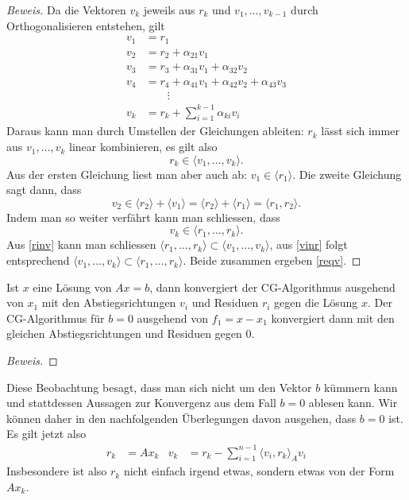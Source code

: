 \documentclass[a4paper,11pt]{article}
\begin{document}
\begin{proof}[Beweis]
Da die Vektoren $v_k$ jeweils aus $r_k$ und $v_1,\dots,v_{k-1}$
durch Orthogonalisieren entstehen, gilt
\begin{align*}
v_1 &= r_1
\\
v_2 &= r_2 + \alpha_{21}v_1
\\
v_3 &= r_3 + \alpha_{31}v_1 + \alpha_{32}v_2
\\
v_4 &= r_4 + \alpha_{41}v_1 + \alpha_{42}v_2 + \alpha_{43}v_3
\\
&\qquad\vdots
\\
v_k &= r_k + \sum_{i=1}^{k-1} \alpha_{ki} v_i
\end{align*}
Daraus kann man durch Umstellen der Gleichungen ableiten: $r_k$ lässt
sich immer aus $v_1,\dots,v_k$ linear kombinieren, es gilt also
\begin{equation}
r_k
\in
\langle v_1,\dots,v_k \rangle.
\label{rinv}
\end{equation}
Aus der ersten Gleichung liest man aber auch ab: $v_1 \in \langle r_1\rangle$.
Die zweite Gleichung sagt dann, dass
\[
v_2\in \langle r_2\rangle + \langle v_1\rangle =
\langle r_2\rangle + \langle r_1\rangle
=
\langle r_1,r_2\rangle.
\]
Indem man so weiter verfährt kann man schliessen, dass
\begin{equation}
v_k \in \langle r_1,\dots, r_k\rangle.
\label{vinr}
\end{equation}
Aus \eqref{rinv} kann man schliessen
$\langle r_1,\dots,r_k\rangle\subset\langle v_1,\dots,v_k\rangle$,
aus \eqref{vinr} folgt entsprechend
$ \langle v_1,\dots,v_k\rangle \subset \langle r_1,\dots,r_k\rangle $.
Beide zusammen ergeben \eqref{reqv}.
\end{proof}

%
%
\begin{beobachtung}
Ist $x$ eine Lösung von $Ax=b$, dann konvergiert der CG-Algorithmus 
ausgehend von $x_1$ mit den Abstiegsrichtungen $v_i$ und Residuen $r_i$
gegen die Lösung $x$.
Der CG-Algorithmus für $b=0$ ausgehend von $f_1=x-x_1$ konvergiert dann
mit den gleichen Abstiegsrichtungen und Residuen gegen $0$.
\end{beobachtung}

\begin{proof}[Beweis]
\end{proof}

Diese Beobachtung besagt, dass man sich nicht um den Vektor $b$ kümmern
kann und stattdessen Aussagen zur Konvergenz aus dem Fall $b=0$
ablesen kann.
Wir können daher in den nachfolgenden Überlegungen davon ausgehen,
dass $b=0$ ist.
Es gilt jetzt also
\begin{align*}
r_k &= Ax_k
&
v_k &= r_k - \sum_{i=1}^{n-1}\langle v_i,r_k\rangle_A v_i
\end{align*}
Insbesondere ist also $r_k$ nicht einfach irgend etwas, sondern
etwas von der Form $Ax_k$.
\end{document}

